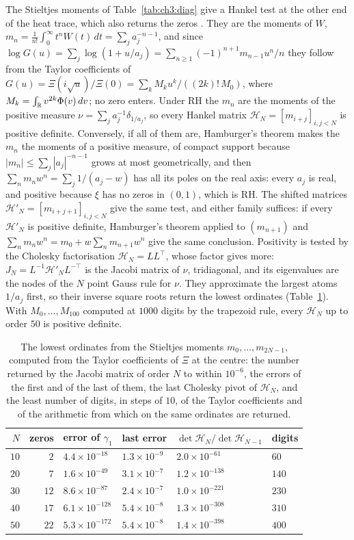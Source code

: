 The Stieltjes moments of Table~\ref{tab:ch3:diag} give a Hankel test at the other end of the heat trace, which also returns the zeros \cite{P26wig}. They are the moments of $W$, $m_n=\frac1{n!}\int_0^\infty t^nW(t)\,dt=\sum_ja_j^{-n-1}$, and since $\log G(u)=\sum_j\log(1+u/a_j)=\sum_{n\ge1}(-1)^{n+1}m_{n-1}u^n/n$ they follow from the Taylor coefficients of $G(u)=\Xi(i\sqrt u)/\Xi(0)=\sum_kM_ku^k/((2k)!\,M_0)$, where $M_k=\int_{\mathbb{R}} v^{2k}\Phi(v)\,dv$; no zero enters. Under RH the $m_n$ are the moments of the positive measure $\nu=\sum_ja_j^{-1}\delta_{1/a_j}$, so every Hankel matrix $\mathcal H_N=[m_{i+j}]_{i,j<N}$ is positive definite. Conversely, if all of them are, Hamburger's theorem makes the $m_n$ the moments of a positive measure, of compact support because $|m_n|\le\sum_j|a_j|^{-n-1}$ grows at most geometrically, and then $\sum_nm_nw^n=\sum_j1/(a_j-w)$ has all its poles on the real axis: every $a_j$ is real, and positive because $\xi$ has no zeros in $(0,1)$, which is RH. The shifted matrices $\mathcal H'_N=[m_{i+j+1}]_{i,j<N}$ give the same test, and either family suffices: if every $\mathcal H'_N$ is positive definite, Hamburger's theorem applied to $(m_{n+1})$ and $\sum_nm_nw^n=m_0+w\sum_nm_{n+1}w^n$ give the same conclusion. Positivity is tested by the Cholesky factorisation $\mathcal H_N=LL^\top$, whose factor gives more: $J_N=L^{-1}\mathcal H'_NL^{-\top}$ is the Jacobi matrix of $\nu$, tridiagonal, and its eigenvalues are the nodes of the $N$ point Gauss rule for $\nu$. They approximate the largest atoms $1/a_j$ first, so their inverse square roots return the lowest ordinates (Table~\ref{tab:ch12:jacobi}). With $M_0,\dots,M_{100}$ computed at $1000$ digits by the trapezoid rule, every $\mathcal H_N$ up to order $50$ is positive definite.

\begin{table}[htbp]
\centering\small
\begin{tabular}{rrllll}
\toprule
$N$ & zeros & error of $\gamma_1$ & last error & $\det\mathcal H_N/\det\mathcal H_{N-1}$ & digits\\
\midrule
$10$ & $2$ & $4.4\times10^{-18}$ & $1.3\times10^{-9}$ & $2.0\times10^{-61}$ & $60$\\
$20$ & $7$ & $1.6\times10^{-49}$ & $3.1\times10^{-7}$ & $1.2\times10^{-138}$ & $140$\\
$30$ & $12$ & $8.6\times10^{-87}$ & $2.4\times10^{-7}$ & $1.0\times10^{-221}$ & $230$\\
$40$ & $17$ & $6.1\times10^{-128}$ & $5.4\times10^{-8}$ & $1.3\times10^{-308}$ & $310$\\
$50$ & $22$ & $5.3\times10^{-172}$ & $5.4\times10^{-8}$ & $1.4\times10^{-398}$ & $400$\\
\bottomrule
\end{tabular}
\caption{The lowest ordinates from the Stieltjes moments $m_0,\dots,m_{2N-1}$, computed from the Taylor coefficients of $\Xi$ at the centre: the number returned by the Jacobi matrix of order $N$ to within $10^{-6}$, the errors of the first and of the last of them, the last Cholesky pivot of $\mathcal H_N$, and the least number of digits, in steps of $10$, of the Taylor coefficients and of the arithmetic from which on the same ordinates are returned.}
\label{tab:ch12:jacobi}
\end{table}

